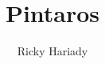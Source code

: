 \documentclass[a4paper, 12pt]{report}
\begin{document}
\title{Pintaros}
\author{Ricky Hariady}

\maketitle









\end{document}
